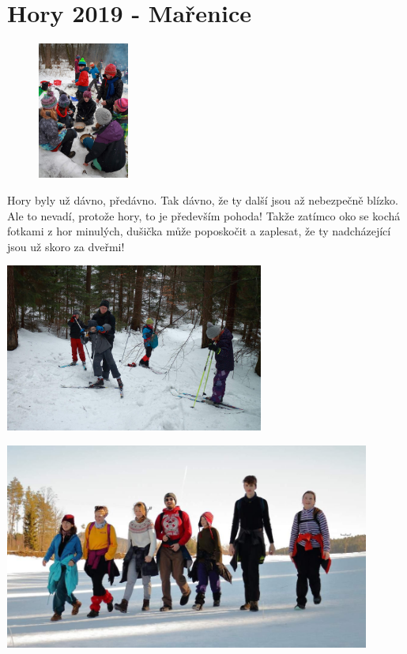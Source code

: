 \chapter{Hory 2019 - Mařenice} %
\label{cha:hory}
\begin{figure}
	\centering

	\vspace{5mm}
	\includegraphics[width=3cm]{img/hory/jidlo.jpg}
\end{figure}
Hory byly už dávno, předávno. Tak dávno, že ty další jsou až nebezpečně blízko. Ale to nevadí, protože hory, to je především pohoda! Takže zatímco oko se kochá fotkami z hor minulých, dušička může poposkočit a zaplesat, že ty nadcházející jsou už skoro za dveřmi!


\begin{center}

\includegraphics[width=8.5cm]{img/hory/lyze.jpg}
\end{center}

\vspace{5mm}

\begin{center}
\includegraphics[width=12cm]{img/hory/drsnaci.jpg}
\end{center}



\clearpage